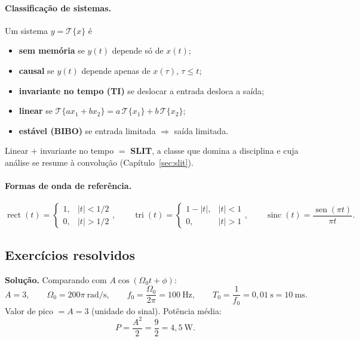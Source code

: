 \paragraph{Classificação de sistemas.} Um sistema $y=\mathcal{T}\{x\}$ é
\begin{itemize}
  \item \textbf{sem memória} se $y(t)$ depende só de $x(t)$;
  \item \textbf{causal} se $y(t)$ depende apenas de $x(\tau)$, $\tau\le t$;
  \item \textbf{invariante no tempo (TI)} se deslocar a entrada desloca a saída;
  \item \textbf{linear} se $\mathcal{T}\{a x_1+b x_2\}=a\,\mathcal{T}\{x_1\}+b\,\mathcal{T}\{x_2\}$;
  \item \textbf{estável (BIBO)} se entrada limitada $\Rightarrow$ saída limitada.
\end{itemize}
Linear $+$ invariante no tempo $=$ \textbf{SLIT}, a classe que domina a
disciplina e cuja análise se resume à convolução (Capítulo~\ref{sec:slit}).

\paragraph{Formas de onda de referência.}
\[
  \operatorname{rect}(t)=
  \begin{cases}1,&|t|<1/2\\0,&|t|>1/2\end{cases},
  \qquad
  \operatorname{tri}(t)=
  \begin{cases}1-|t|,&|t|<1\\0,&|t|>1\end{cases},
  \qquad
  \operatorname{sinc}(t)=\frac{\operatorname{sen}(\pi t)}{\pi t}.
\]

\subsection*{Exercícios resolvidos}


\textbf{Solução.} Comparando com $A\cos(\Omega_0 t+\phi)$:
\[
  A=3,\qquad \Omega_0=200\pi\ \text{rad/s},\qquad
  f_0=\frac{\Omega_0}{2\pi}=100\ \text{Hz},\qquad
  T_0=\frac{1}{f_0}=0{,}01\ \text{s}=10\ \text{ms}.
\]
Valor de pico $=A=3$ (unidade do sinal). Potência média:
\[
  P=\frac{A^2}{2}=\frac{9}{2}=4{,}5\ \text{W}.
\]

